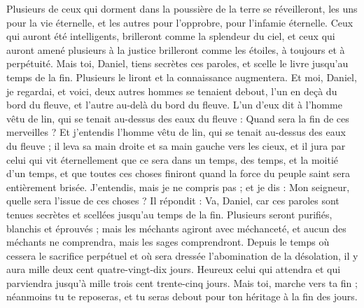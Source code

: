 \begin{multicols}{2}
Plusieurs de ceux qui dorment dans la poussière de la terre se réveilleront, les uns pour la vie éternelle, et les autres pour l’opprobre, pour l'infamie éternelle.
Ceux qui auront été intelligents, brilleront comme la splendeur du ciel, et ceux qui auront amené plusieurs à la justice brilleront comme les étoiles, à toujours et à perpétuité.
Mais toi, Daniel, tiens secrètes ces paroles, et scelle le livre jusqu'au temps de la fin. Plusieurs le liront et la connaissance augmentera.
Et moi, Daniel, je regardai, et voici, deux autres hommes se tenaient debout, l'un en deçà du bord du fleuve, et l'autre au-delà du bord du fleuve.
L’un d’eux dit à l'homme vêtu de lin, qui se tenait au-dessus des eaux du fleuve : Quand sera la fin de ces merveilles ?
Et j'entendis l'homme vêtu de lin, qui se tenait au-dessus des eaux du fleuve ; il leva sa main droite et sa main gauche vers les cieux, et il jura par celui qui vit éternellement que ce sera dans un temps, des temps, et la moitié d’un temps,  et que toutes ces choses finiront quand la force du peuple saint sera entièrement brisée.
J’entendis, mais je ne compris pas ; et je dis : Mon seigneur, quelle sera l'issue de ces choses ?
Il répondit : Va, Daniel, car ces paroles sont tenues secrètes et scellées jusqu'au temps de la fin.
Plusieurs seront purifiés, blanchis et éprouvés ; mais les méchants agiront avec méchanceté, et aucun des méchants ne comprendra, mais les sages comprendront.
Depuis le temps où cessera le sacrifice perpétuel et où sera dressée l'abomination de la désolation, il y aura mille deux cent quatre-vingt-dix jours.
Heureux celui qui attendra et qui parviendra jusqu’à mille trois cent trente-cinq jours.
Mais toi, marche vers ta fin ; néanmoins tu te reposeras, et tu seras debout pour ton héritage à la fin des jours.
\PPE{}
\end{multicols}
